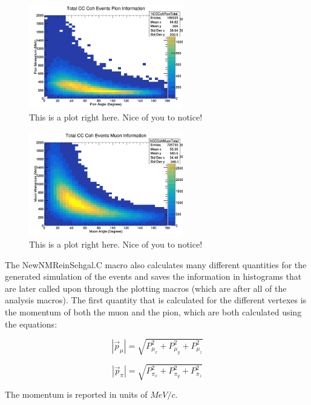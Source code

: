 \documentclass[11pt]{article}
\begin{document}
\begin{figure}[H]
\centering
\includegraphics[width=0.6\textwidth]{NewNMReinSehgalImages/8-TotalCCCohPionInfoNMRS.png}
\caption{This is a plot right here. Nice of you to notice!}
\end{figure}

\begin{figure}[H]
\centering
\includegraphics[width=0.6\textwidth]{NewNMReinSehgalImages/9-TotalCCCohMuonInfoNMRS.png}
\caption{This is a plot right here. Nice of you to notice!}
\end{figure}

The NewNMReinSehgal.C macro also calculates many different quantities for the generated simulation of the events and saves the information in histograms that are later called upon through the plotting macros (which are after all of the analysis macros). The first quantity that is calculated for the different vertexes is the momentum of both the muon and the pion, which are both calculated using the equations:

\begin{equation}
|\vec{p}_\mu| = \sqrt{P_{\mu_x}^2 + P_{\mu_y}^2 + P_{\mu_z}^2}
\end{equation}

\begin{equation}
|\vec{p}_\pi| = \sqrt{P_{\pi_x}^2 + P_{\pi_y}^2 + P_{\pi_z}^2}
\end{equation}

\noindent
The momentum is reported in units of $MeV/c$.
\end{document}
